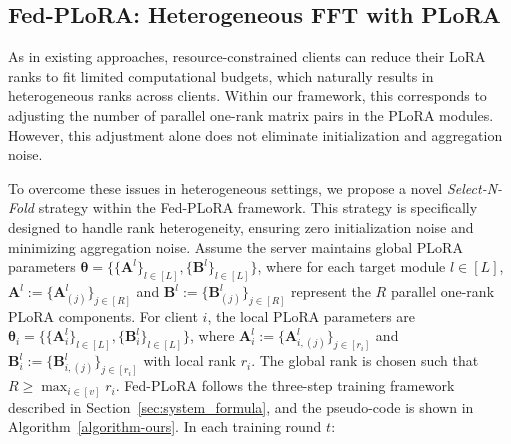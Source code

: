 \documentclass{article} %
\begin{document}




\subsection{Fed-PLoRA: Heterogeneous FFT with PLoRA}

As in existing approaches, resource-constrained clients can reduce their LoRA ranks to fit limited computational budgets, which naturally results in heterogeneous ranks across clients. Within our framework, this corresponds to adjusting the number of parallel one-rank matrix pairs in the PLoRA modules. However, this adjustment alone does not eliminate initialization and aggregation noise.

To overcome these issues in heterogeneous settings, we propose a novel \textit{Select-N-Fold} strategy within the Fed-PLoRA framework. This strategy is specifically designed to handle rank heterogeneity, ensuring zero initialization noise and minimizing aggregation noise. 
% 
Assume the server maintains global PLoRA parameters $\boldsymbol{\theta} = \{\{\mathbf{A}^l\}_{l\in[L]}, \{\mathbf{B}^l\}_{l\in[L]} \}$, where for each target module $l\in [L]$, ${\mathbf{A}^l} := \{ \mathbf{A}_{(j)}^l\}_{j\in[R]}$ and ${\mathbf{B}^l} := \{ \mathbf{B}_{(j)}^l\}_{j\in[R]}$ represent the $R$ parallel one-rank PLoRA components. For client $i$, the local PLoRA parameters are $\boldsymbol{\theta}_i = \{\{\mathbf{A}_i^l\}_{l\in[L]}, \{\mathbf{B}_i^l\}_{l\in[L]}\}$, where ${\mathbf{A}_{i}^l} := \{ \mathbf{A}_{i,(j)}^l\}_{j\in[r_i]}$ and ${\mathbf{B}_{i}^l} := \{ \mathbf{B}_{i,(j)}^l\}_{j\in[r_i]}$ with local rank $r_i$. The global rank is chosen such that $R \geq \max_{i \in [v]} r_i$. 
% 
Fed-PLoRA follows the three-step training framework described in Section~\ref{sec:system_formula}, and the pseudo-code is shown in Algorithm~\ref{algorithm-ours}. In each training round $t$:
\end{document}
